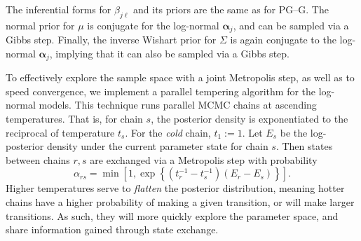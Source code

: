     The inferential forms for $\beta_{j\ell}$ and its priors are the same as for PG--G.  The 
  normal prior for $\mu$ is conjugate for the log-normal $\bm{\alpha}_j$, and can be sampled
  via a Gibbs step.  Finally, the inverse Wishart prior for $\Sigma$ is again conjugate to
  the log-normal $\bm{\alpha}_j$, implying that it can also be sampled via a Gibbs step.

To effectively explore the sample space with a joint Metropolis step, as well as
    to speed convergence, we implement a parallel tempering algorithm\citep{earl2005} 
    for the log-normal models. This technique runs parallel MCMC
    chains at ascending temperatures. That is, for chain $s$, the posterior density is 
    exponentiated to the reciprocal of temperature $t_s$.  For the \emph{cold} chain, 
    $t_1 := 1$.  Let $E_s$ be the log-posterior density under the current parameter 
    state for chain $s$.  Then states between chains $r,s$ are exchanged via a Metropolis 
    step with probability 
    \[
    \alpha_{rs} = \min
    \left[1, \exp\left\lbrace(t_{r}^{-1} - t_{s}^{-1})(E_r - E_s)\right\rbrace\right].
    \]
    Higher temperatures serve to \emph{flatten} the posterior distribution, meaning hotter
    chains have a higher probability of making a given transition, or will make larger 
    transitions.  As such, they will more quickly explore the parameter space, and share
    information gained through state exchange.


